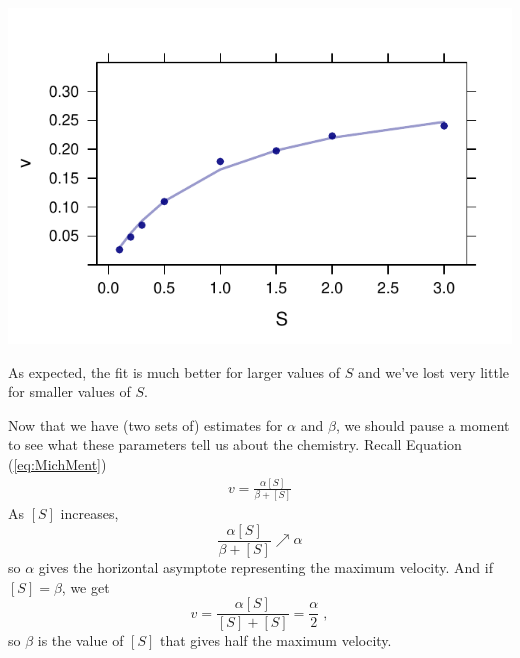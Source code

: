 \documentclass{article}
\newenvironment{knitrout}{}{} %
\begin{document}
\begin{knitrout}
{\centering \includegraphics[width=.47\textwidth]{figures/modeling-nls} 

}


\end{knitrout}

As expected, the fit is much better for larger values of $S$ and we've lost very little for smaller values of $S$.

Now that we have (two sets of) estimates for $\alpha$ and $\beta$, we should
pause a moment to see what these parameters tell us about the chemistry.
Recall Equation (\ref{eq:MichMent})
	\begin{align*}
	v = \frac{ \alpha [S] }{ \beta + [S] }
	\end{align*}
As $[S]$ increases,
\[
	\frac{ \alpha [S] }{ \beta + [S] } \nearrow \alpha
\]
so $\alpha$ gives the horizontal asymptote representing the maximum velocity.
And if $[S] = \beta$, we get
\[
v = \frac{ \alpha [S] }{ [S] + [S] } = \frac{\alpha}{2} \; ,
\]
so $\beta$ is the value of $[S]$ that gives half the maximum velocity.
\end{document}
